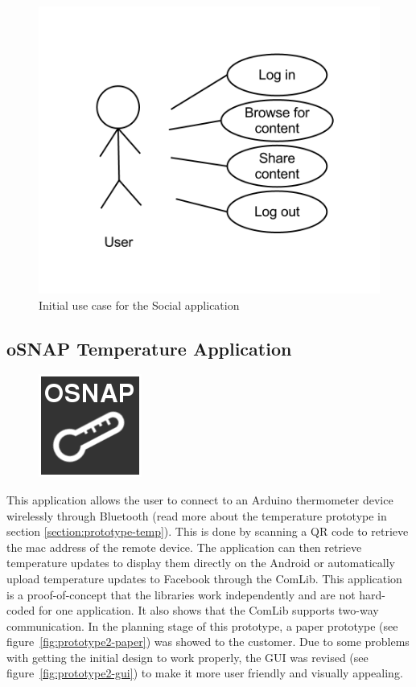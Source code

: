 \begin{figure}[H]
	\centering \includegraphics[scale=0.35]{img/design-socialappusecase1}
	\caption{Initial use case for the Social application}
	\label{fig:design-socialappusecase1}
\end{figure}

\subsection{oSNAP Temperature Application}
\begin{figure}
	\centering \includegraphics[scale=0.25]{img/app-temp}
\end{figure}
This application allows the user to connect to an Arduino thermometer device wirelessly through Bluetooth (read more about the 
temperature prototype in section \ref{section:prototype-temp}). This is done by scanning a QR code to retrieve the mac address
 of the remote device. The application can then retrieve temperature updates to display them directly on the Android or automatically 
upload temperature updates to Facebook through the ComLib. This application is a proof-of-concept that the libraries work independently
 and are not hard-coded for one application. It also shows that the ComLib supports two-way communication.
In the planning stage of this prototype, a paper prototype (see figure~\ref{fig:prototype2-paper}) was showed to the
customer. Due to some problems with getting the initial design to work properly, the GUI was revised (see
figure~\ref{fig:prototype2-gui}) to make it more user friendly and visually appealing.

